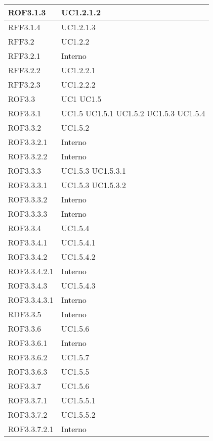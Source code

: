 \begin{center}
\begin{longtable}{| p{4cm} | p{4cm} |}
\hline
ROF3.1.3   &  UC1.2.1.2 \\
\hline
RFF3.1.4   &  UC1.2.1.3 \\
\hline
RFF3.2   &  UC1.2.2 \\
\hline
RFF3.2.1   &  Interno \\
\hline
RFF3.2.2   &  UC1.2.2.1 \\
\hline
RFF3.2.3   &  UC1.2.2.2 \\
\hline
ROF3.3   &  UC1 \newline UC1.5 \\
\hline
ROF3.3.1   &  UC1.5 \newline UC1.5.1 \newline UC1.5.2 \newline UC1.5.3 \newline UC1.5.4 \\
\hline
ROF3.3.2   &  UC1.5.2 \\
\hline
ROF3.3.2.1   &  Interno \\
\hline
ROF3.3.2.2   &  Interno \\
\hline
ROF3.3.3   &  UC1.5.3 \newline UC1.5.3.1  \\
\hline
ROF3.3.3.1   &  UC1.5.3 \newline UC1.5.3.2  \\
\hline
ROF3.3.3.2   &  Interno \\
\hline
ROF3.3.3.3   &  Interno \\
\hline
ROF3.3.4   &  UC1.5.4 \\
\hline
ROF3.3.4.1   &  UC1.5.4.1 \\
\hline
ROF3.3.4.2   &  UC1.5.4.2 \\
\hline
ROF3.3.4.2.1   &  Interno \\
\hline
ROF3.3.4.3   &  UC1.5.4.3 \\
\hline
ROF3.3.4.3.1   &  Interno \\
\hline
RDF3.3.5   &  Interno \\
\hline
ROF3.3.6   &  UC1.5.6 \\
\hline
ROF3.3.6.1   &  Interno \\
\hline
ROF3.3.6.2   &  UC1.5.7 \\
\hline
ROF3.3.6.3   &  UC1.5.5 \\
\hline
ROF3.3.7   &  UC1.5.6 \\
\hline
ROF3.3.7.1   &  UC1.5.5.1 \\
\hline
ROF3.3.7.2   &  UC1.5.5.2 \\
\hline
ROF3.3.7.2.1   &  Interno \\

\end{longtable}
\end{center}
